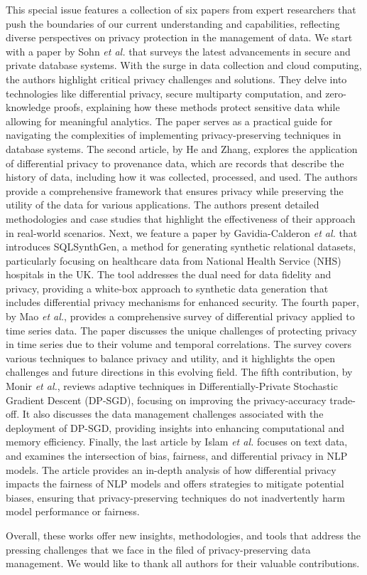 \documentclass[11pt]{article}
\begin{document}
This special issue features a collection of six papers from expert researchers that push the boundaries of our current understanding and capabilities, reflecting diverse perspectives on privacy protection in the management of data. We start with a paper by Sohn {\it et al.} that surveys the latest advancements in secure and private database systems. With the surge in data collection and cloud computing, the authors highlight critical privacy challenges and solutions. They delve into technologies like differential privacy, secure multiparty computation, and zero-knowledge proofs, explaining how these methods protect sensitive data while allowing for meaningful analytics. The paper serves as a practical guide for navigating the complexities of implementing privacy-preserving techniques in database systems.
The second article, by He and Zhang, explores the application of differential privacy to provenance data, which are records that describe the history of data, including how it was collected, processed, and used. The
authors provide a comprehensive framework that ensures privacy while preserving the utility of the data for various applications. The authors present detailed methodologies and case studies that highlight the effectiveness of their approach in real-world scenarios. 
Next, we feature a paper by Gavidia-Calderon {\it et al.} that introduces SQLSynthGen, a method for generating synthetic relational datasets, particularly focusing on healthcare data from National Health Service (NHS) hospitals in the UK. The tool addresses the dual need for data fidelity and privacy, providing a white-box approach to synthetic data generation that includes differential privacy mechanisms for enhanced security.
The fourth paper, by Mao {\it et al.}, provides a comprehensive survey of differential privacy applied to time series data. The paper discusses the unique challenges of protecting privacy in time series due to their volume
and temporal correlations. The survey covers various techniques to balance privacy and utility, and it highlights the open challenges and future directions in this evolving field.
The fifth contribution, by Monir {\it et al.}, reviews adaptive techniques in Differentially-Private Stochastic Gradient Descent (DP-SGD), focusing on improving the privacy-accuracy trade-off. It also discusses the data management challenges associated with the deployment of DP-SGD, providing insights into enhancing computational and memory efficiency.
Finally, the last article by Islam {\it et al.} focuses on text data, and examines the intersection of bias, fairness, and differential privacy in NLP models. The article provides an in-depth analysis of how differential privacy impacts the fairness of NLP models and offers strategies to mitigate potential biases, ensuring that privacy-preserving techniques do not inadvertently harm model performance or fairness.

Overall, these works offer new insights, methodologies, and tools that address the pressing challenges that we face in the filed of privacy-preserving data management. We would like to thank all authors for their valuable contributions.
\end{document}
